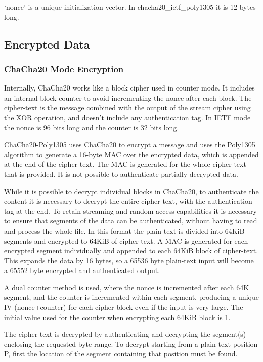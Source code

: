 \documentclass[10pt]{article}
\begin{document}
`nonce' is a unique initialization vector.
In chacha20\_ietf\_poly1305 it is 12 bytes long.

\subsection{Encrypted Data}
\subsubsection{ChaCha20 Mode Encryption}

Internally, ChaCha20 works like a block cipher used in counter mode.
It includes an internal block counter to avoid incrementing the nonce after each block.
The cipher-text is the message combined with the output of the stream cipher using the XOR operation,
and doesn't include any authentication tag.
In IETF mode the nonce is 96 bits long and the counter is 32 bits long.

ChaCha20-Poly1305 uses ChaCha20 to encrypt a message and uses the Poly1305 algorithm to
generate a 16-byte MAC over the encrypted data, which is appended at the end of the
cipher-text.
The MAC is generated for the whole cipher-text that is provided.
It is not possible to authenticate partially decrypted data.

While it is possible to decrypt individual blocks in ChaCha20, to authenticate the content
it is necessary to decrypt the entire cipher-text,  with the authentication tag at the end.
To retain streaming and random access capabilities it is necessary to ensure that segments
of the data can be authenticated, without having to read and process the whole file.
In this format the plain-text is divided into 64KiB segments and encrypted to 64KiB of cipher-text.
A MAC is generated for each encrypted segment individually and appended to each 64KiB block of cipher-text.
This expands the data by 16 bytes, so a 65536 byte plain-text input will become a 65552 byte encrypted
and authenticated output.

A dual counter method is used, where the nonce is incremented after each 64K segment, and
the counter is incremented within each segment, producing a unique IV (nonce+counter) for
each cipher block even if the input is very large.
The initial value used for the counter when encrypting each 64KiB block is 1.

The cipher-text is decrypted by authenticating and decrypting the segment(s) enclosing
the requested byte range.
To decrypt starting from a plain-text position P, first the location of the segment containing that position
must be found.
\end{document}
